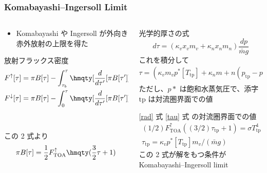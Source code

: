 \documentclass[aspectratio=149]{beamer}
\newcommand{\hmTOA}{\mathrm{TOA}}
\newcommand{\hmtp}{\mathrm{tp}}
\renewcommand{\qty}{\hmqty}
\begin{document}
\begin{frame}
	\frametitle{Komabayashi--Ingersoll Limit}
	\begin{columns}[T]
		\begin{column}{.5\textwidth}
			\begin{itemize}
				\item Komabayashi や Ingersoll  が外向き赤外放射の上限を得た
			\end{itemize}
			\begin{block}{放射フラックス密度}\tiny
				\begin{gather}
					F^\uparrow[\tau]=
					\pi B[\tau]-\int^\tau_{\tau_b}\qty[\dv{}{\tau'}[\pi B[\tau']]
					\exp\left[-\frac{3}{2}(\tau'-\tau)\right]]d\tau'
					\\
					\begin{split}
						F^\downarrow[\tau]=
						\pi B[\tau]-\int^\tau_0\qty[\dv{}{\tau'}[\pi B[\tau']]
						\exp\left[-\frac{3}{2}(\tau-\tau')\right]]d\tau'\\
						-\pi B[0]\exp\left[-\frac{3}{2}\tau\right]
					\end{split}
				\end{gather}
				この 2 式より
				\begin{equation}
					\pi B[\tau]=\frac{1}{2}F^\uparrow_\hmTOA\qty(\frac{3}{2}\tau+1)
					\label{rad}
				\end{equation}
			\end{block}
		\end{column}
		\begin{column}{.5\textwidth}
			\begin{block}{光学的厚さの式}\tiny
				\begin{equation}
					d\tau=(\kappa_vx_vm_v+\kappa_nx_nm_n)\frac{dp}{\bar mg}
				\end{equation}
				これを積分して
				\begin{equation}
					\tau=(\kappa_vm_vp^*[T_\hmtp]+\kappa_nm+n(p_\hmtp-p^*[T_\hmtp]))
					\frac{p}{p_\hmtp}\frac{1}{\bar mg}\label{tau}
				\end{equation}
				ただし、\(p*\) は飽和水蒸気圧で、添字 \(\hmtp\) は対流圏界面での値
			\end{block}
			\begin{block}{\eqref{rad} 式 \eqref{tau} 式 の対流圏界面での値}\tiny
				\begin{gather}
					(1/2)F^\uparrow_\hmTOA((3/2)\tau_\hmtp+1)=\sigma T^4_\hmtp\\
					\tau_\hmtp=\kappa_vp^*[T_\hmtp]m_v/(\bar mg)
				\end{gather}
				この 2 式が解をもつ条件が Komabayashi--Ingersoll limit
			\end{block}
		\end{column}
	\end{columns}
\end{frame}
\end{document}
